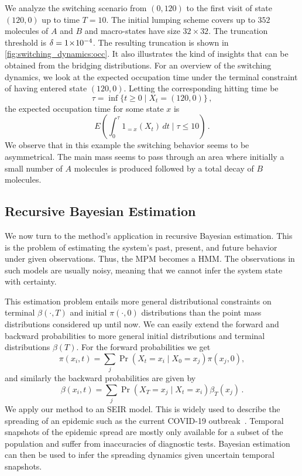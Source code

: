 We analyze the switching scenario from $(0, 120)$ to the first visit of state $(120, 0)$ up to time $T=10$. The initial lumping scheme covers up to $352$ molecules of $A$ and $B$ and  macro-states have size $32\times32$.
The truncation threshold is $\delta= 1\!\times\!10^{-4} $.
The resulting truncation is shown in \autoref{fig:switching_dynamics:occ}.
It also illustrates the kind of insights that can be obtained from the bridging distributions.
For an overview of the switching dynamics, we look at the expected occupation time under the terminal constraint of having entered state $(120,0)$. Letting the corresponding hitting time be 
\[
	\tau=\inf\{t\geq 0\mid X_t=(120, 0)\}\,,
\]
the expected occupation time for some state $x$ is
\[
	E\left(\int_0^{\tau}1_{=x}(X_t)\,dt\mid \tau\leq 10\right)\,.
\]
We observe that in this example the switching  behavior seems to be asymmetrical.
The main mass seems to pass through an area where initially a small number of $A$ molecules is produced followed by a total decay of $B$ molecules.


\subsection{Recursive Bayesian Estimation}
We now turn to the method's application in recursive Bayesian estimation.
This is the problem of estimating the system's
past, present, and future behavior under given observations.
Thus, the \ac{MPM} becomes a \acf{HMM}.
The observations in such models are usually noisy, meaning that we cannot infer the system state with certainty.

This estimation problem entails more general distributional constraints on terminal $\beta(\cdot,T)$ and initial $\pi(\cdot, 0)$ distributions than the point mass distributions considered up until now.
We can easily extend the forward and backward probabilities to more general initial
distributions   and terminal distributions $\beta(T)$.
For the forward probabilities we get
\begin{equation}
    \pi(x_i, t) = \sum_j \Pr(X_t=x_i\mid X_0=x_j) \pi(x_j,0),
\end{equation}
and similarly the backward probabilities are given by
\begin{equation}
    \beta(x_i, t) = \sum_j\Pr(X_T=x_j\mid X_t = x_i) \beta_T(x_j)\,.
\end{equation}
We apply our method to an \acf{SEIR} model.
This is widely used to describe the spreading of an epidemic such as the current COVID-19 outbreak~\cite{he2020seir,grossmann2020importance}.
Temporal snapshots of the epidemic spread  are mostly only available for a subset of the population and suffer from   inaccuracies of diagnostic tests.
Bayesian estimation can then be used to infer the spreading dynamics given uncertain temporal snapshots.

